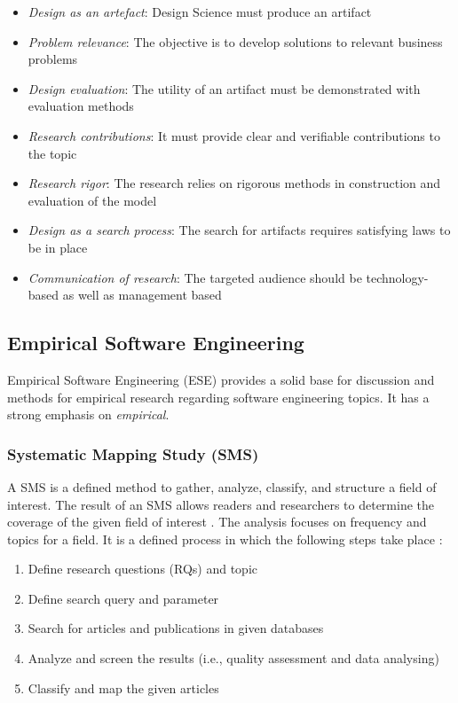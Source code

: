 \begin{itemize}
    \item \textit{Design as an artefact}: Design Science must produce an artifact
    \item \textit{Problem relevance}: The objective is to develop solutions to relevant business problems
    \item \textit{Design evaluation}: The utility of an artifact must be demonstrated with evaluation methods
    \item \textit{Research contributions}: It must provide clear and verifiable contributions to the topic
    \item \textit{Research rigor}: The research relies on rigorous methods in construction and evaluation of the model
    \item \textit{Design as a search process}: The search for artifacts requires satisfying laws to be in place
    \item \textit{Communication of research}: The targeted audience should be technology-based as well as management based
\end{itemize}


\subsection{Empirical Software Engineering}

Empirical Software Engineering (ESE) provides a solid base for discussion and methods for empirical
research regarding software engineering topics. It has a strong emphasis on \textit{empirical}.

\subsubsection{Systematic Mapping Study (SMS)}

A SMS is a defined method to gather, analyze, classify, and structure a field of interest.
The result of an SMS allows readers and researchers to determine the coverage of the given
field of interest \cite{petersen:SMS}. The analysis focuses on frequency and topics for a
field. It is a defined process in which the following steps take place \cite{petersen:SMS}:

\begin{enumerate}
    \item Define research questions (RQs) and topic
    \item Define search query and parameter
    \item Search for articles and publications in given databases
    \item Analyze and screen the results (i.e., quality assessment and data analysing)
    \item Classify and map the given articles
\end{enumerate}


